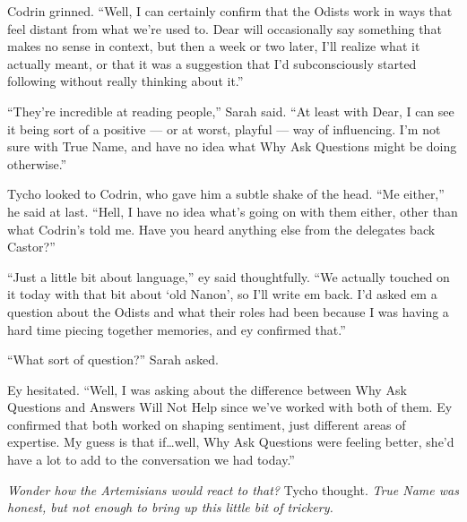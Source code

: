 Codrin grinned. ``Well, I can certainly confirm that the Odists work in ways that feel distant from what we're used to. Dear will occasionally say something that makes no sense in context, but then a week or two later, I'll realize what it actually meant, or that it was a suggestion that I'd subconsciously started following without really thinking about it.''

``They're incredible at reading people,'' Sarah said. ``At least with Dear, I can see it being sort of a positive — or at worst, playful — way of influencing. I'm not sure with True Name, and have no idea what Why Ask Questions might be doing otherwise.''

Tycho looked to Codrin, who gave him a subtle shake of the head. ``Me either,'' he said at last. ``Hell, I have no idea what's going on with them either, other than what Codrin's told me. Have you heard anything else from the delegates back Castor?''

``Just a little bit about language,'' ey said thoughtfully. ``We actually touched on it today with that bit about `old Nanon', so I'll write em back. I'd asked em a question about the Odists and what their roles had been because I was having a hard time piecing together memories, and ey confirmed that.''

``What sort of question?'' Sarah asked.

Ey hesitated. ``Well, I was asking about the difference between Why Ask Questions and Answers Will Not Help since we've worked with both of them. Ey confirmed that both worked on shaping sentiment, just different areas of expertise. My guess is that if\ldots well, Why Ask Questions were feeling better, she'd have a lot to add to the conversation we had today.''

\emph{Wonder how the Artemisians would react to that?} Tycho thought. \emph{True Name was honest, but not enough to bring up this little bit of trickery.}
